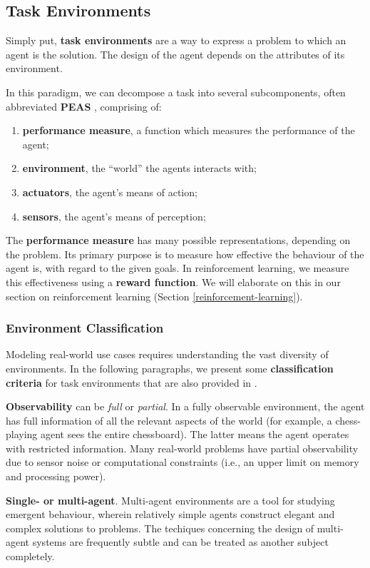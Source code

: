 \subsection{Task Environments}
Simply put, \textbf{task environments} are a way to express a problem to which an agent is the solution.
The design of the agent depends on the attributes of its environment.

In this paradigm, we can decompose a task into several subcomponents, often abbreviated \textbf{PEAS} \cite{aima}, comprising of:
\begin{enumerate}
    \item \textbf{performance measure}, a function which measures the performance of the agent;
    \item \textbf{environment}, the ``world'' the agents interacts with;
    \item \textbf{actuators}, the agent's means of action;
    \item \textbf{sensors}, the agent's means of perception;
\end{enumerate}

The \textbf{performance measure} has many possible representations, depending on the problem.
Its primary purpose is to measure how effective the behaviour of the agent is, with regard to the given goals.
In reinforcement learning, we measure this effectiveness using a \textbf{reward function}.
We will elaborate on this in our section on reinforcement learning (Section \ref{reinforcement-learning}).

\subsubsection{Environment Classification}

Modeling real-world use cases requires understanding the vast diversity of environments.
In the following paragraphs, we present some \textbf{classification criteria} for task environments that are also provided in \cite{aima}.

\textbf{Observability} can be \emph{full} or \emph{partial}.
In a fully observable environment, the agent has full information of all the relevant aspects of the world (for example, a chess-playing agent sees the entire chessboard).
The latter means the agent operates with restricted information.
Many real-world problems have partial observability due to sensor noise or computational constraints (i.e., an upper limit on memory and processing power).

\textbf{Single- or multi-agent}.
Multi-agent environments are a tool for studying emergent behaviour, wherein relatively simple agents construct elegant and complex solutions to problems.
The techiques concerning the design of multi-agent systems are frequently subtle and can be treated as another subject completely.

